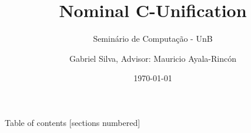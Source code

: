 \documentclass{beamer}
\title{Nominal C-Unification}
\subtitle{Seminário de Computação - UnB}
\date{\today}
\author{Gabriel Silva, Advisor: Mauricio Ayala-Rincón}
\institute{Department of Mathematics - University of Brasília}
\begin{document}
\maketitle

\begin{frame}{Table of contents}
    [sections numbered]
    \tableofcontents
\end{frame}

%
%
%
%
%
\end{document}
